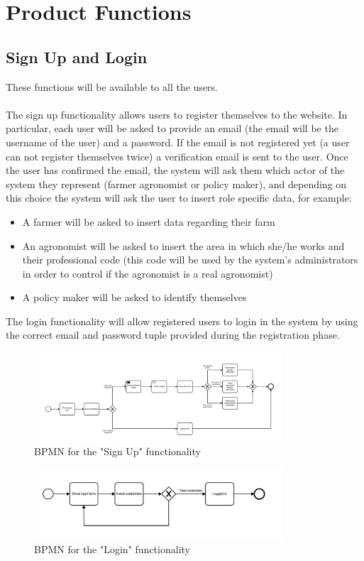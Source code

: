 \documentclass[10pt]{report}
\begin{document}
\section{Product Functions}
\subsection{Sign Up and Login}
These functions will be available to all the users.\\ \\
The sign up functionality allows users to register themselves to the website. In particular, each user will be asked to provide an email (the email will be the username of the user) and a password. If the email is not registered yet (a user can not register themselves twice) a verification email is sent to the user. Once the user has confirmed the email, the system will ask them which actor of the system they represent (farmer agronomist or policy maker), and depending on this choice the system will ask the user to insert role specific data, for example:\\
\begin{itemize}
    \item A farmer will be asked to insert data regarding their farm
    \item An agronomist will be asked to insert the area in which she/he works and their professional code (this code will be used by the system's administrators in order to control if the agronomist is a real agronomist)
    \item A policy maker will be asked to identify themselves
\end{itemize}
The login functionality will allow registered users to login in the system by using the correct email and password tuple provided during the registration phase.
\begin{figure}[H]
    \centering
    \includegraphics[width=350px]{BPMN/BPMN 221a.png}
    \caption{BPMN for the "Sign Up" functionality}
\end{figure}
\begin{figure}[H]
    \centering
    \includegraphics[width=350px]{BPMN/BPMN 221b.jpg}
    \caption{BPMN for the "Login" functionality}
\end{figure}
\end{document}
